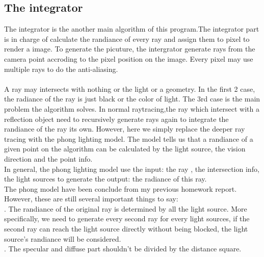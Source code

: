 \documentclass[acmtog]{acmart}
\begin{document}
\subsection{The integrator}
\quad The integrator is the another main algorithm of this program.The integrator part is in charge of calculate the randiance of every ray and assign them to pixel to render a image.
To generate the picuture, the intergrator generate rays from the camera point accroding to the pixel position on the image. Every pixel may use multiple rays to do the anti-aliasing.\\\\
A ray may intersects with nothing or the light or a geometry. In the first 2 case, the radiance of the ray is just black or the color of light. The 3rd case is the main problem the algorithm solves.
In normal raytracing,the ray which intersect with a reflection object need to recursively generate rays again to integrate the randiance of the ray its own. However, here we simply replace the deeper ray tracing with the phong lighting model. The model tells us that a randiance of a given point on the algorithm can be calculated by the light source, the vision direction and the point info.\\
In general, the phong lighting model use the input: the ray , the intersection info, the light sources to generate the output: the radiance of this ray.\\
The phong model have been conclude from my previous homework report. However, these are still several important things to say:\\
\quad{}. The randiance of the original ray is determined by all the light source. More specifically, we need to generate every second ray for every light sources, if the second ray can reach the light source directly without being blocked, the light source's randiance will be considered.\\
\quad{}. The specular and diffuse part shouldn't be divided by the distance square.
\end{document}
